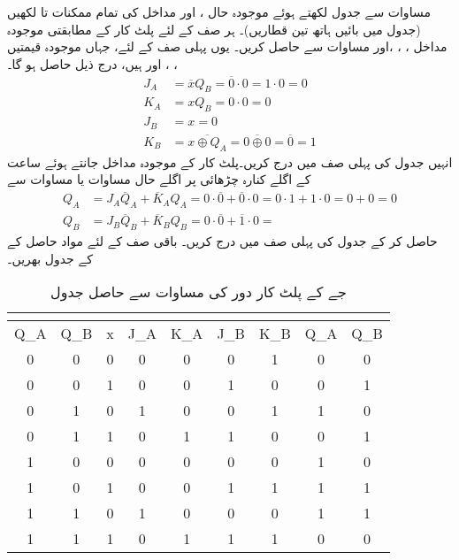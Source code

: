مساوات   سے جدول   لکھتے ہوئے موجودہ حال ،  اور مداخل  کی تمام ممکنات  تا  لکھیں (جدول میں بائیں ہاتھ تین قطاریں)۔ ہر صف  کے لئے پلٹ کار کے مطابقتی موجودہ   مداخل ، ، ،اور     مساوات  سے حاصل کریں۔ یوں پہلی  صف کے لئے،  جہاں موجودہ قیمتیں ، ، اور  ہیں، درج ذیل حاصل ہو گا۔
\begin{align*}
J_A&=\overline{x}Q_B=\overline{0}\cdot 0=1\cdot 0=0\\
K_A&=xQ_B=0\cdot 0=0\\
J_B&=x=0\\
K_B&=\overline{x\oplus Q_A}=\overline{0\oplus 0}=\overline{0}=1
\end{align*}
انہیں جدول کی پہلی صف میں درج کریں۔پلٹ کار کے موجودہ مداخل جانتے  ہوئے  ساعت کے اگلے کنارہ چڑھائی پر اگلے حال  مساوات    یا مساوات   سے 
\begin{align*}
Q_A&=J_A\overline{Q}_A+\overline{K}_AQ_A=0\cdot \overline{0}+\overline{0}\cdot 0=0\cdot 1+1\cdot 0=0+0=0\\
Q_B&=J_B\overline{Q}_B+\overline{K}_BQ_B=0\cdot \overline{0}+\overline{1}\cdot 0= 
\end{align*}
 حاصل کر کے جدول کی پہلی صف میں درج کریں۔ باقی صف کے لئے مواد حاصل کے کے جدول بھریں۔
 
\begin{table}
\caption{جے کے پلٹ کار دور کی مساوات   سے حاصل جدول}
\label{جدول_ترتیبی_جے_کے_بطور_مثال}
\centering
\begin{otherlanguage}{english}
\begin{tabular}{CCC|CCCC|CC}
\toprule
{} &&\\
\midrule
Q_A&Q_B&x&J_A&K_A&J_B&K_B&Q_A&Q_B\\
&0&0&0&0&0&1&0&0\\
0&0&1&0&0&1&0&0&1\\
&1&0&1&0&0&1&1&0\\
0&1&1&0&1&1&0&0&1\\
&0&0&0&0&0&0&1&0\\
1&0&1&0&0&1&1&1&1\\
&1&0&1&0&0&0&1&1\\
1&1&1&0&1&1&1&0&0\\
\bottomrule
\end{tabular}
\end{otherlanguage}
\end{table}


